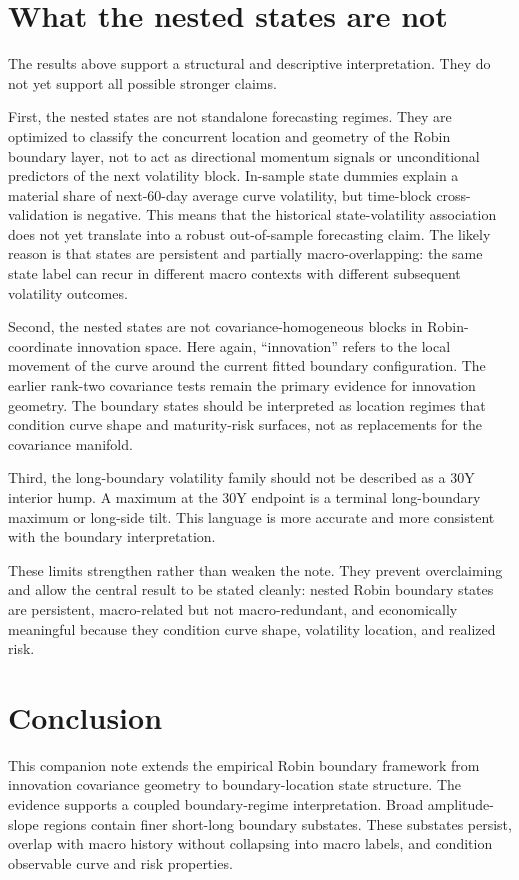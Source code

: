\documentclass[11pt]{article}
\begin{document}
\section{What the nested states are not}

The results above support a structural and descriptive interpretation. They do not yet support all possible stronger claims.

First, the nested states are not standalone forecasting regimes. They are optimized to classify the concurrent location and geometry of the Robin boundary layer, not to act as directional momentum signals or unconditional predictors of the next volatility block. In-sample state dummies explain a material share of next-60-day average curve volatility, but time-block cross-validation is negative. This means that the historical state-volatility association does not yet translate into a robust out-of-sample forecasting claim. The likely reason is that states are persistent and partially macro-overlapping: the same state label can recur in different macro contexts with different subsequent volatility outcomes.

Second, the nested states are not covariance-homogeneous blocks in Robin-coordinate innovation space. Here again, ``innovation'' refers to the local movement of the curve around the current fitted boundary configuration. The earlier rank-two covariance tests remain the primary evidence for innovation geometry. The boundary states should be interpreted as location regimes that condition curve shape and maturity-risk surfaces, not as replacements for the covariance manifold.

Third, the long-boundary volatility family should not be described as a 30Y interior hump. A maximum at the 30Y endpoint is a terminal long-boundary maximum or long-side tilt. This language is more accurate and more consistent with the boundary interpretation.

These limits strengthen rather than weaken the note. They prevent overclaiming and allow the central result to be stated cleanly: nested Robin boundary states are persistent, macro-related but not macro-redundant, and economically meaningful because they condition curve shape, volatility location, and realized risk.

\section{Conclusion}

This companion note extends the empirical Robin boundary framework from innovation covariance geometry to boundary-location state structure. The evidence supports a coupled boundary-regime interpretation. Broad amplitude-slope regions contain finer short-long boundary substates. These substates persist, overlap with macro history without collapsing into macro labels, and condition observable curve and risk properties.
\end{document}
